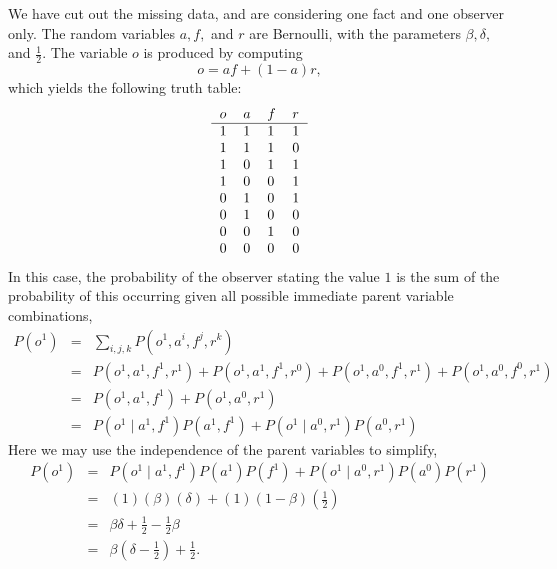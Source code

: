\documentclass{amsart}
\theoremstyle{definition}
\theoremstyle{plain}
\numberwithin{equation}{section}
\begin{document}
We have cut out the missing data, and are considering one fact and one
observer only. The random variables $a,f,$ and $r$ are Bernoulli, with the
parameters $\beta ,\delta ,$ and $\frac{1}{2}$. The variable $o$ is produced
by computing%
\begin{equation*}
o=af+\left( 1-a\right) r,
\end{equation*}%
which yields the following truth table:%
\begin{equation*}
\begin{tabular}{llll}
$o$ & $a$ & $f$ & $r$ \\ \hline
$1$ & $1$ & $1$ & $1$ \\ 
$1$ & $1$ & $1$ & $0$ \\ 
$1$ & $0$ & $1$ & $1$ \\ 
$1$ & $0$ & $0$ & $1$ \\ 
$0$ & $1$ & $0$ & $1$ \\ 
$0$ & $1$ & $0$ & $0$ \\ 
$0$ & $0$ & $1$ & $0$ \\ 
$0$ & $0$ & $0$ & $0$%
\end{tabular}%
\end{equation*}%
In this case, the probability of the observer stating the value $1$ is the
sum of the probability of this occurring given all possible immediate parent
variable combinations, 
\begin{eqnarray*}
P\left( o^{1}\right)  &=&\sum_{i,j,k}P\left( o^{1},a^{i},f^{j},r^{k}\right) 
\\
&=&P\left( o^{1},a^{1},f^{1},r^{1}\right) +P\left(
o^{1},a^{1},f^{1},r^{0}\right) +P\left( o^{1},a^{0},f^{1},r^{1}\right)
+P\left( o^{1},a^{0},f^{0},r^{1}\right)  \\
&=&P\left( o^{1},a^{1},f^{1}\right) +P\left( o^{1},a^{0},r^{1}\right)  \\
&=&P\left( o^{1}\mid a^{1},f^{1}\right) P\left( a^{1},f^{1}\right) +P\left(
o^{1}\mid a^{0},r^{1}\right) P\left( a^{0},r^{1}\right) 
\end{eqnarray*}%
Here we may use the independence of the parent variables to simplify,%
\begin{eqnarray*}
P\left( o^{1}\right)  &=&P\left( o^{1}\mid a^{1},f^{1}\right) P\left(
a^{1}\right) P\left( f^{1}\right) +P\left( o^{1}\mid a^{0},r^{1}\right)
P\left( a^{0}\right) P\left( r^{1}\right)  \\
&=&\left( 1\right) \left( \beta \right) \left( \delta \right) +\left(
1\right) \left( 1-\beta \right) \left( \frac{1}{2}\right)  \\
&=&\beta \delta +\frac{1}{2}-\frac{1}{2}\beta  \\
&=&\beta \left( \delta -\frac{1}{2}\right) +\frac{1}{2}.
\end{eqnarray*}%
\end{document}
